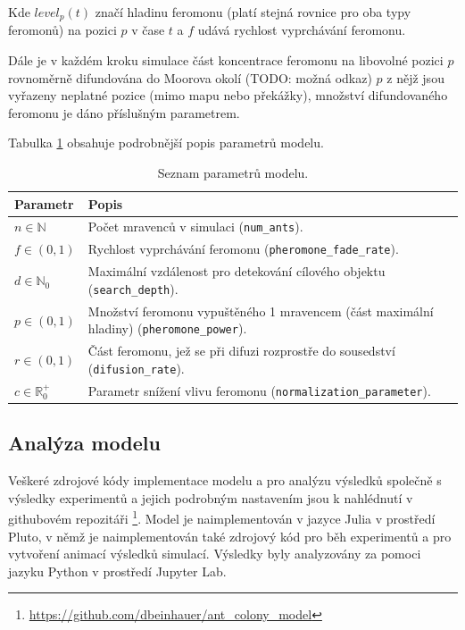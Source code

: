 \documentclass[10pt,a4paper,twocolumn]{article}
\begin{document}
Kde $level_{p}(t)$ značí hladinu feromonu (platí stejná rovnice pro oba typy feromonů) 
na pozici $p$ v čase $t$ a $f$ udává rychlost vyprchávání feromonu.

Dále je v každém kroku simulace část koncentrace feromonu na libovolné pozici $p$ 
rovnoměrně difundována do Moorova okolí (TODO: možná odkaz) $p$ z nějž jsou vyřazeny neplatné pozice
(mimo mapu nebo překážky), množství difundovaného feromonu je dáno 
příslušným parametrem.

Tabulka \ref{table:parametry} obsahuje podrobnější popis parametrů modelu.


\begin{table}[t]
  \centering %
  \begin{tabular}{l p{5cm}}
  \toprule
  Parametr & Popis \\
  \midrule
    $n \in \mathbb{N}$ & Počet mravenců v simulaci 
    (\texttt{num\_ants}). \\ 
    $f \in (0, 1)$ & Rychlost vyprchávání feromonu 
    (\texttt{pheromone\_fade\_rate}). \\
    $d \in \mathbb{N}_0$ & Maximální vzdálenost pro detekování 
    cílového objektu (\texttt{search\_depth}).\\
    $p \in (0, 1)$ & Množství feromonu vypuštěného 1 mravencem 
    (část maximální hladiny) (\texttt{pheromone\_power}).\\
    $r \in (0, 1)$ & Část feromonu, jež se při difuzi rozprostře do 
    sousedství (\texttt{difusion\_rate}). \\
    $c \in \mathbb{R}_0^{+}$ & Parametr snížení vlivu feromonu
    (\texttt{normalization\_parameter}).\\ 
  \bottomrule
  \end{tabular}
  \caption{Seznam parametrů modelu.} \label{table:parametry} 
\end{table}



\subsection{Analýza modelu}

Veškeré zdrojové kódy implementace modelu a pro analýzu výsledků společně s
výsledky experimentů a jejich podrobným nastavením jsou k nahlédnutí v 
githubovém repozitáři \citet{Beinhauer_Ant_Colony_Model_2023}
\footnote{\url{https://github.com/dbeinhauer/ant_colony_model}}. Model je 
naimplementován v jazyce Julia v prostředí Pluto, v němž je naimplementován
také zdrojový kód pro běh experimentů a pro vytvoření animací výsledků
simulací. Výsledky byly analyzovány za pomoci jazyku Python v prostředí 
Jupyter Lab.
\end{document}
